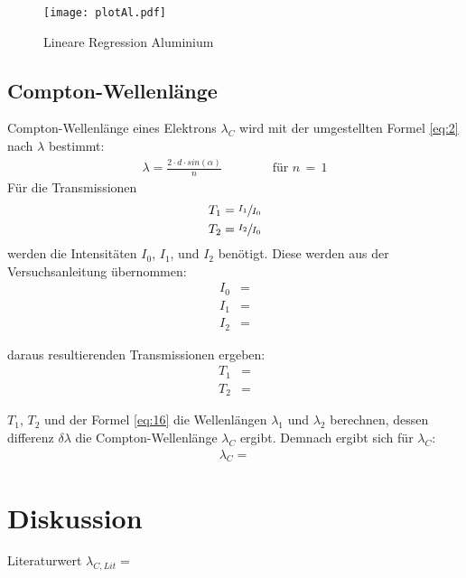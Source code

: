    \begin{figure}[H]
        \centering
        \texttt{[image: plotAl.pdf]}
        \caption{Lineare Regression Aluminium}
        \label{fig:3}
    \end{figure}

    \subsection{Compton-Wellenlänge}

    \justifying Compton-Wellenlänge eines Elektrons $\lambda_C$ wird mit der umgestellten Formel \eqref{eq:2} nach $\lambda$ bestimmt:
    \begin{align}
        \lambda = \frac{2 \cdot d \cdot sin(\alpha)}{n} \qquad \qquad \text{für $n\,=\,1$} \label{eq:16}
    \end{align} 
    Für die Transmissionen
    \begin{align}
        T_1 &= \sfrac{I_1}{I_0} \\
        T_2 &= \sfrac{I_2}{I_0} 
    \end{align}
    werden die Intensitäten $I_0$, $I_1$, und $I_2$ benötigt. Diese werden aus der Versuchsanleitung \cite{V603} übernommen:
    \begin{subequations}\label{eq:17}
    \begin{align}
        I_0 &= \text{} \label{eq:17a}\\
        I_1 &= \text{} \label{eq:17b}\\
        I_2 &= \text{} \label{eq:17c}
    \end{align}
    \end{subequations}

    \justifying daraus resultierenden Transmissionen ergeben:
    \begin{align}
        T_1 &= \text{} \label{eq:18}\\
        T_2 &= \text{} \label{eq:19}
    \end{align}

    \justifying $T_1$, $T_2$ und der Formel \eqref{eq:16} die Wellenlängen $\lambda_1$ und $\lambda_2$ berechnen, dessen differenz $\delta \lambda$ die Compton-Wellenlänge $\lambda_C$ ergibt.
    Demnach ergibt sich für $\lambda_C$:
    \begin{align}
        \lambda_C = \text{} \label{eq:20}
    \end{align}



\section{Diskussion}

    Literaturwert $\lambda_{C,Lit} = \text{}$ 

\newpage
\printbibliography

